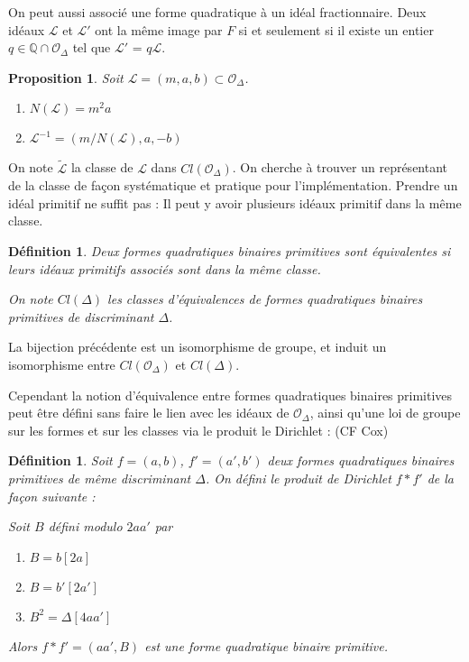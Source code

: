 \documentclass{article}
\newcommand{\Q}[0]{\mathbb{Q}}
\newcommand{\OR}[0]{\mathcal{O}}
\newcommand{\LR}[0]{\mathcal{L}}
\newcommand{\CL}[0]{\tilde{\LR}}
\newtheorem{Prop}[The]{Proposition}
\newtheorem{Def}[The]{Définition}
\begin{document}
On peut aussi associé une forme quadratique à un idéal fractionnaire. Deux idéaux $\LR$ et $\LR'$ ont la même image par $F$ si et seulement si il existe un entier $q\in\Q\cap\OR_{\Delta}$ tel que $\LR'$ = $q\LR$. 

\begin{Prop}
	Soit $\LR = (m,a,b)\subset\OR_{\Delta}$. 
	\begin{enumerate}
		\item $N(\LR) = m^2a$
		\item $\LR^{-1} = (m/N(\LR),a,-b)$
	\end{enumerate}
\end{Prop}

On note $\CL$ la classe de $\LR$ dans $Cl(\OR_{\Delta})$. On cherche à trouver un représentant de la classe de façon systématique et pratique pour l'implémentation. Prendre un idéal primitif ne suffit pas : Il peut y avoir plusieurs idéaux primitif dans la même classe. 

\begin{Def}
	Deux formes quadratiques binaires primitives sont équivalentes si leurs idéaux primitifs associés sont dans la même classe.
	
	On note $Cl(\Delta)$ les classes d'équivalences de formes quadratiques binaires primitives de discriminant $\Delta$.
\end{Def}


La bijection précédente est un isomorphisme de groupe, et induit un isomorphisme entre $Cl(\OR_{\Delta})$ et $Cl(\Delta)$. 

Cependant la notion d'équivalence entre formes quadratiques binaires primitives peut être défini sans faire le lien avec les idéaux de $\OR_{\Delta}$, ainsi qu'une loi de groupe sur les formes et sur les classes via le produit le Dirichlet : (CF Cox)

\begin{Def}
	Soit $f = (a,b)$, $f' = (a', b')$ deux formes quadratiques binaires primitives de même discriminant $\Delta$. On défini le produit de Dirichlet $f*f'$ de la façon suivante :
	
	Soit $B$ défini modulo $2aa'$ par
	
	\begin{enumerate}
		\item $B = b [2a]$
		\item $B = b' [2a']$
		\item $B^2 = \Delta [4aa']$
	\end{enumerate}
	
	Alors $f*f' = (aa', B)$ est une forme quadratique binaire primitive.
\end{Def}
\end{document}
